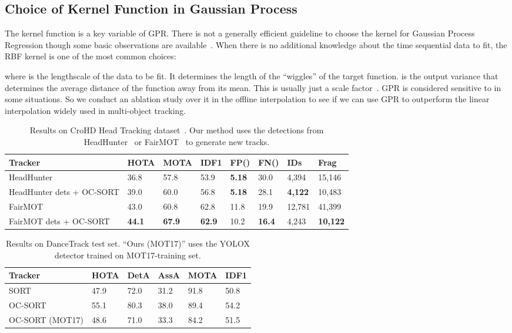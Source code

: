 \documentclass[10pt,twocolumn,letterpaper]{article}
\begin{document}
\subsection{Choice of Kernel Function in Gaussian Process}
The kernel function is a key variable of GPR. There is not a generally efficient guideline to choose the kernel for Gaussian Process Regression though some basic observations are available~\cite{duvenaud2014automatic}. When there is no additional knowledge about the time sequential data to fit, the RBF kernel is one of the most common choices:

where   is the lengthscale of the data to be fit. It determines the length of the ``wiggles'' of the target function.  is the output variance that determines the average distance of the function away from its mean. This is usually just a scale factor~\cite{duvenaud2014automatic}. GPR is considered sensitive to  in some situations. So we conduct an ablation study over it in the offline interpolation to see if we can use GPR to outperform the linear interpolation widely used in multi-object tracking.

\begin{table*}[!htbp]
\centering
\caption{Results on CroHD Head Tracking dataset~\cite{headtrack}. Our method uses the detections from HeadHunter~\cite{headtrack} or FairMOT~\cite{zhang2021fairmot} to generate new tracks.}
\setlength{\tabcolsep}{7pt}
\scriptsize
\begin{tabular}{ l | p{22px}p{22px}p{22px}p{26px}  p{26px}p{22px}p{22px}}
\toprule
Tracker &  HOTA & MOTA & IDF1 &  FP({\footnotesize }) & FN({\footnotesize }) & IDs & Frag  \\
\midrule
HeadHunter~\cite{headtrack} & 36.8 & 57.8 & 53.9 & \textbf{5.18} & 30.0 & 4,394 & 15,146  \\ 
HeadHunter dets + OC-SORT & 39.0 & 60.0 & 56.8 & \textbf{5.18} & 28.1 & \textbf{4,122} & 10,483\\
\midrule
FairMOT~\cite{zhang2021fairmot} & 43.0 & 60.8 & 62.8 & 11.8 & 19.9 & 12,781 & 41,399\\
FairMOT dets + OC-SORT & \textbf{44.1} & \textbf{67.9} & \textbf{62.9} & 10.2 & \textbf{16.4} & 4,243 & \textbf{10,122}\\
\bottomrule
\end{tabular}
\label{table:headtrack}
\end{table*}

\begin{table}
\centering
\caption{Results on DanceTrack test set. ``Ours (MOT17)'' uses the YOLOX detector trained on MOT17-training set.}
\setlength{\tabcolsep}{7pt}
\scriptsize
\begin{tabular}{ l | p{0.68cm}p{0.68cm}p{0.68cm}p{0.68cm}p{0.68cm}}
\toprule
Tracker & HOTA & DetA & AssA & MOTA & IDF1\\
\midrule
SORT & 47.9 & 72.0 & 31.2 & 91.8 & 50.8 \\
OC-SORT & 55.1 & 80.3 & 38.0 & 89.4 & 54.2\\
OC-SORT (MOT17) & 48.6 & 71.0 & 33.3 & 84.2 & 51.5\\
\bottomrule
\end{tabular}
\label{table:dancetrack_more}
\end{table}
\end{document}
